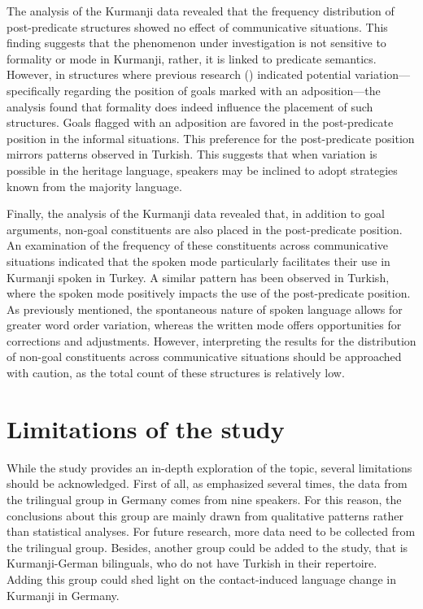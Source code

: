 The analysis of the Kurmanji data revealed that the frequency distribution of post-predicate structures showed no effect of communicative situations. This finding suggests that the phenomenon under investigation is not sensitive to formality or mode in Kurmanji, rather, it is linked to predicate semantics. However, in structures where previous research (\citealt{Haig2014, Gundogdu2019}) indicated potential variation—specifically regarding the position of goals marked with an adposition—the analysis found that formality does indeed influence the placement of such structures. Goals flagged with an adposition are favored in the post-predicate position in the informal situations. This preference for the post-predicate position mirrors patterns observed in Turkish. This suggests that when variation is possible in the heritage language, speakers may be inclined to adopt strategies known from the majority language.

Finally, the analysis of the Kurmanji data revealed that, in addition to goal arguments, non-goal constituents are also placed in the post-predicate position. An examination of the frequency of these constituents across communicative situations indicated that the spoken mode particularly facilitates their use in Kurmanji spoken in Turkey. A similar pattern has been observed in Turkish, where the spoken mode positively impacts the use of the post-predicate position. As previously mentioned, the spontaneous nature of spoken language allows for greater word order variation, whereas the written mode offers opportunities for corrections and adjustments. However, interpreting the results for the distribution of non-goal constituents across communicative situations should be approached with caution, as the total count of these structures is relatively low.

\section{Limitations of the study}\label{sec:key:7.4}

While the study provides an in-depth exploration of the topic, several limitations should be acknowledged. First of all, as emphasized several times, the data from the trilingual group in Germany comes from nine speakers. For this reason, the conclusions about this group are mainly drawn from qualitative patterns rather than statistical analyses. For future research, more data need to be collected from the trilingual group. Besides, another group could be added to the study, that is Kurmanji-German bilinguals, who do not have Turkish in their repertoire. Adding this group could shed light on the contact-induced language change in Kurmanji in Germany.

